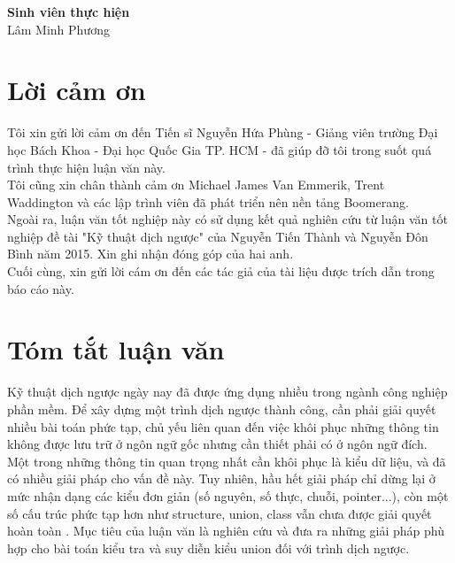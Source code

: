 \documentclass[12pt]{report}
\begin{document}
	\hspace*{8cm}\textbf{Sinh viên thực hiện}
	\\[10ex]
	\hspace*{9cm}Lâm Minh Phương
		
	\chapter*{Lời cảm ơn}
	Tôi xin gửi lời cảm ơn đến Tiến sĩ Nguyễn Hứa Phùng - Giảng viên trường Đại học Bách Khoa - Đại học Quốc Gia TP. HCM - đã giúp đỡ tôi trong suốt quá trình thực hiện luận văn này.\\
	Tôi cũng xin chân thành cảm ơn Michael James Van Emmerik, Trent Waddington và các lập trình viên đã phát triển nên nền tảng Boomerang.\\
	Ngoài ra, luận văn tốt nghiệp này có sử dụng kết quả nghiên cứu từ luận văn tốt nghiệp đề tài "Kỹ thuật dịch ngược" của Nguyễn Tiến Thành và Nguyễn Đôn Bình năm 2015. Xin ghi nhận đóng góp của hai anh.\\
	Cuối cùng, xin gửi lời cám ơn đến các tác giả của tài liệu được trích dẫn trong báo cáo này. 
	
	\newpage
	\chapter*{Tóm tắt luận văn}
	Kỹ thuật dịch ngược ngày nay đã được ứng dụng nhiều trong ngành công nghiệp phần mềm. Để xây dựng một trình dịch ngược thành công, cần phải giải quyết nhiều bài toán phức tạp, chủ yếu liên quan đến việc khôi phục những thông tin không được lưu trữ ở ngôn ngữ gốc nhưng cần thiết phải có ở ngôn ngữ đích. Một trong những thông tin quan trọng nhất cần khôi phục là kiểu dữ liệu, và đã có nhiều giải pháp cho vấn đề này. Tuy nhiên, hầu hết giải pháp chỉ dừng lại ở mức nhận dạng các kiểu đơn giản (số nguyên, số thực, chuỗi, pointer...), còn một số cấu trúc phức tạp hơn như structure, union, class vẫn chưa được giải quyết hoàn toàn \cite{ssavan}. Mục tiêu của luận văn là nghiên cứu và đưa ra những giải pháp phù hợp cho bài toán kiểu tra và suy diễn kiểu union đối với trình dịch ngược.
	
	
	\newpage
	\tableofcontents
	
	\newpage
	\listoftables
	
	\newpage
	\listoffigures
	
	\newpage
	\lstlistoflistings
	
	\newpage
	
	
	
	
	
	
	
	\newpage
	\printbibliography
\end{document}
